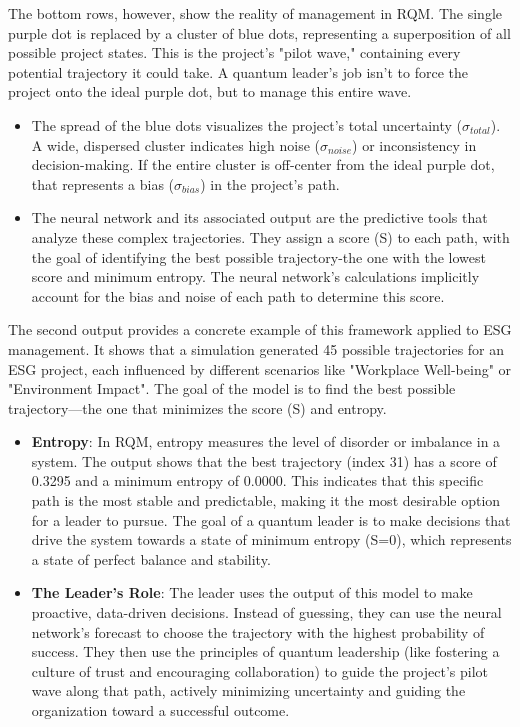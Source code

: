 \documentclass{article}
\begin{document}
The bottom rows, however, show the reality of management in RQM. The single purple dot is replaced by a cluster of blue dots, representing a superposition of all possible project states. This is the project's "pilot wave," containing every potential trajectory it could take. A quantum leader's job isn't to force the project onto the ideal purple dot, but to manage this entire wave.
\begin{itemize}
\item The spread of the blue dots visualizes the project's total uncertainty ($\sigma_{total}$). A wide, dispersed cluster indicates high noise ($\sigma_{noise}$) or inconsistency in decision-making. If the entire cluster is off-center from the ideal purple dot, that represents a bias ($\sigma_{bias}$) in the project's path.
\item The neural network and its associated output are the predictive tools that analyze these complex trajectories. They assign a score (S) to each path, with the goal of identifying the best possible trajectory-the one with the lowest score and minimum entropy. The neural network's calculations implicitly account for the bias and noise of each path to determine this score.
\end{itemize}

The second output provides a concrete example of this framework applied to ESG management. It shows that a simulation generated 45 possible trajectories for an ESG project, each influenced by different scenarios like "Workplace Well-being" or "Environment Impact". The goal of the model is to find the best possible trajectory---the one that minimizes the score (S) and entropy.
\begin{itemize}
\item \textbf{Entropy}: In RQM, entropy measures the level of disorder or imbalance in a system. The output shows that the best trajectory (index 31) has a score of 0.3295 and a minimum entropy of 0.0000. This indicates that this specific path is the most stable and predictable, making it the most desirable option for a leader to pursue. The goal of a quantum leader is to make decisions that drive the system towards a state of minimum entropy (S=0), which represents a state of perfect balance and stability.
\item \textbf{The Leader's Role}: The leader uses the output of this model to make proactive, data-driven decisions. Instead of guessing, they can use the neural network's forecast to choose the trajectory with the highest probability of success. They then use the principles of quantum leadership (like fostering a culture of trust and encouraging collaboration) to guide the project's pilot wave along that path, actively minimizing uncertainty and guiding the organization toward a successful outcome.
\end{itemize}
\end{document}
